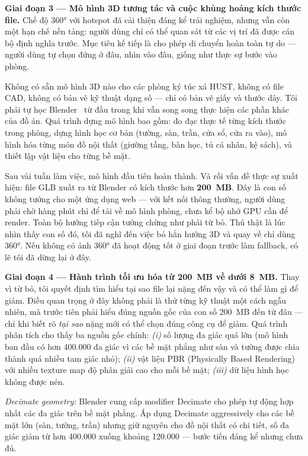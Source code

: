 \documentclass[../DoAn.tex]{subfiles}
\begin{document}
\textbf{Giai đoạn 3 --- Mô hình 3D tương tác và cuộc khủng hoảng kích thước file.}
Chế độ 360° với hotspot đã cải thiện đáng kể trải nghiệm, nhưng vẫn còn một
hạn chế nền tảng: người dùng chỉ có thể quan sát từ các vị trí đã được cán bộ
định nghĩa trước. Mục tiêu kế tiếp là cho phép di chuyển hoàn toàn tự do ---
người dùng tự chọn đứng ở đâu, nhìn vào đâu, giống như thực sự bước vào phòng.

Không có sẵn mô hình 3D nào cho các phòng ký túc xá HUST, không có file CAD,
không có bản vẽ kỹ thuật dạng số --- chỉ có bản vẽ giấy và thước dây. Tôi
phải tự học Blender~\cite{blender2024} từ đầu trong khi vẫn song song thực
hiện các phần khác của đồ án. Quá trình dựng mô hình bao gồm: đo đạc thực tế
từng kích thước trong phòng, dựng hình học cơ bản (tường, sàn, trần, cửa sổ,
cửa ra vào), mô hình hóa từng món đồ nội thất (giường tầng, bàn học, tủ cá
nhân, kệ sách), và thiết lập vật liệu cho từng bề mặt.

Sau vài tuần làm việc, mô hình đầu tiên hoàn thành. Và rồi vấn đề thực sự
xuất hiện: file GLB xuất ra từ Blender có kích thước hơn \textbf{200~MB}. Đây
là con số không tưởng cho một ứng dụng web --- với kết nối thông thường, người
dùng phải chờ hàng phút chỉ để tải về mô hình phòng, chưa kể bộ nhớ GPU cần
để render. Toàn bộ hướng tiếp cận tưởng chừng như phải từ bỏ. Thú thật là lúc
nhìn thấy con số đó, tôi đã nghĩ đến việc bỏ hẳn hướng 3D và quay về chỉ dùng
360°. Nếu không có ảnh 360° đã hoạt động tốt ở giai đoạn trước làm fallback,
có lẽ tôi đã dừng lại ở đây.

\textbf{Giai đoạn 4 --- Hành trình tối ưu hóa từ 200~MB về dưới 8~MB.}
Thay vì từ bỏ, tôi quyết định tìm hiểu tại sao file lại nặng đến vậy và có
thể làm gì để giảm. Điều quan trọng ở đây không phải là thử từng kỹ thuật một
cách ngẫu nhiên, mà trước tiên phải hiểu đúng nguồn gốc của con số 200~MB đến
từ đâu --- chỉ khi biết rõ \textit{tại sao} nặng mới có thể chọn đúng công cụ
để giảm. Quá trình phân tích cho thấy ba nguồn gốc chính: \textit{(i)} số lượng
đa giác quá lớn (mô hình ban đầu có hơn 400.000 đa giác vì các bề mặt phẳng
như sàn và tường được chia thành quá nhiều tam giác nhỏ); \textit{(ii)} vật
liệu PBR (Physically Based Rendering) với nhiều texture map độ phân giải cao
cho mỗi bề mặt; \textit{(iii)} dữ liệu hình học không được nén.

\textit{Decimate geometry:} Blender cung cấp modifier Decimate cho phép tự
động hợp nhất các đa giác trên bề mặt phẳng. Áp dụng Decimate aggressively
cho các bề mặt lớn (sàn, tường, trần) nhưng giữ nguyên cho đồ nội thất có
chi tiết, số đa giác giảm từ hơn 400.000 xuống khoảng 120.000 --- bước tiến
đáng kể nhưng chưa đủ.
\end{document}
